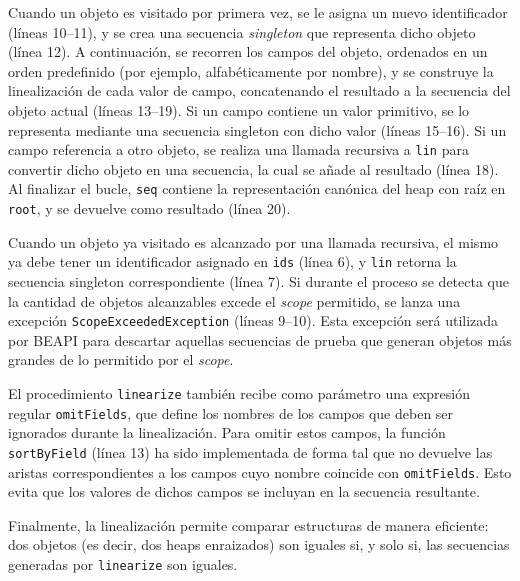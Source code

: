 Cuando un objeto es visitado por primera vez, se le asigna un nuevo identificador (líneas 10--11), y se crea una secuencia \emph{singleton}
que representa dicho objeto (línea 12). A continuación, se recorren los campos del objeto, ordenados en un orden predefinido (por 
ejemplo, alfabéticamente por nombre), y se construye la linealización de cada valor de campo, concatenando el resultado a la secuencia 
del objeto actual (líneas 13--19). Si un campo contiene un valor primitivo, se lo representa mediante una secuencia singleton con dicho 
valor (líneas 15--16). Si un campo referencia a otro objeto, se realiza una llamada recursiva a \texttt{lin} para convertir dicho objeto 
en una secuencia, la cual se añade al resultado (línea 18). Al finalizar el bucle, \texttt{seq} contiene la representación canónica del 
heap con raíz en \texttt{root}, y se devuelve como resultado (línea 20).

Cuando un objeto ya visitado es alcanzado por una llamada recursiva, el mismo ya debe tener un identificador asignado en \texttt{ids} 
(línea 6), y \texttt{lin} retorna la secuencia singleton correspondiente (línea 7). Si durante el proceso se detecta que la cantidad de 
objetos alcanzables excede el \emph{scope} permitido, se lanza una excepción \texttt{ScopeExceededException} (líneas 9--10). Esta 
excepción será utilizada por \textsf{BEAPI} para descartar aquellas secuencias de prueba que generan objetos más grandes de lo 
permitido por el \emph{scope}.

El procedimiento \texttt{linearize} también recibe como parámetro una expresión regular \texttt{omitFields}, que define los nombres 
de los campos que deben ser ignorados durante la linealización. Para omitir estos 
campos, la función \texttt{sortByField} (línea 13) ha sido implementada de forma tal que no devuelve las aristas correspondientes a 
los campos cuyo nombre coincide con \texttt{omitFields}. Esto evita que los valores de dichos campos se incluyan en la secuencia 
resultante.

Finalmente, la linealización permite comparar estructuras de manera eficiente: dos objetos (es decir, dos heaps enraizados) son iguales 
si, y solo si, las secuencias generadas por \texttt{linearize} son iguales.

